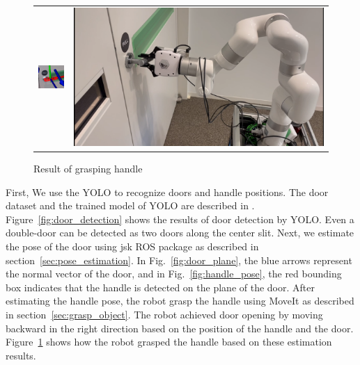 \documentclass[runningheads,a4paper]{llncs}
\begin{document}
\begin{figure}[tbp]
\begin{tabular}{cc}
        \begin{minipage}[t]{0.45\hsize}
            \centering
            \includegraphics[width=0.4\linewidth]{images/handle_pose.png}
            \caption{Handle pose estimation}
            \label{fig:handle_pose}
        \end{minipage} &
        \begin{minipage}[t]{0.45\hsize}
            \centering
            \includegraphics[width=0.8\linewidth]{images/grasp_door_handle.png}
            \caption{Result of grasping handle}
            \label{fig:grasp_handle}
        \end{minipage}
    \end{tabular}
\end{figure}
First, We use the YOLO to recognize doors and handle positions.
The door dataset and the trained model of YOLO are described in \cite{Arduengo_2021}.
Figure~\ref{fig:door_detection} shows the results of door detection by YOLO.
Even a double-door can be detected as two doors along the center slit.
Next, we estimate the pose of the door using jsk ROS package as described in section~\ref{sec:pose_estimation}.
In Fig.~\ref{fig:door_plane}, the blue arrows represent the normal vector of the door, and in Fig.~\ref{fig:handle_pose}, the red bounding box indicates that the handle is detected on the plane of the door.
After estimating the handle pose, the robot grasp the handle using MoveIt as described in section~\ref{sec:grasp_object}.
The robot achieved door opening by moving backward in the right direction based on the position of the handle and the door.
Figure~\ref{fig:grasp_handle} shows how the robot grasped the handle based on these estimation results.
\end{document}
